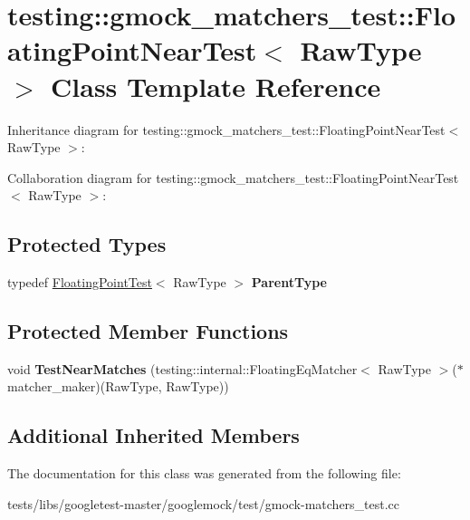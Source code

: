 \hypertarget{classtesting_1_1gmock__matchers__test_1_1FloatingPointNearTest}{}\section{testing\+:\+:gmock\+\_\+matchers\+\_\+test\+:\+:Floating\+Point\+Near\+Test$<$ Raw\+Type $>$ Class Template Reference}
\label{classtesting_1_1gmock__matchers__test_1_1FloatingPointNearTest}


Inheritance diagram for testing\+:\+:gmock\+\_\+matchers\+\_\+test\+:\+:Floating\+Point\+Near\+Test$<$ Raw\+Type $>$\+:


Collaboration diagram for testing\+:\+:gmock\+\_\+matchers\+\_\+test\+:\+:Floating\+Point\+Near\+Test$<$ Raw\+Type $>$\+:
\subsection*{Protected Types}
\begin{DoxyCompactItemize}
\item 
\mbox{\label{classtesting_1_1gmock__matchers__test_1_1FloatingPointNearTest_ac767d2bf3e518d1e7cf9dfafc76cc53a}} 
typedef \hyperlink{classtesting_1_1gmock__matchers__test_1_1FloatingPointTest}{Floating\+Point\+Test}$<$ Raw\+Type $>$ {\bfseries Parent\+Type}
\end{DoxyCompactItemize}
\subsection*{Protected Member Functions}
\begin{DoxyCompactItemize}
\item 
\mbox{\label{classtesting_1_1gmock__matchers__test_1_1FloatingPointNearTest_a712b564197ab76f58d345c5e3e73955d}} 
void {\bfseries Test\+Near\+Matches} (testing\+::internal\+::\+Floating\+Eq\+Matcher$<$ Raw\+Type $>$($\ast$matcher\+\_\+maker)(Raw\+Type, Raw\+Type))
\end{DoxyCompactItemize}
\subsection*{Additional Inherited Members}


The documentation for this class was generated from the following file\+:\begin{DoxyCompactItemize}
\item 
tests/libs/googletest-\/master/googlemock/test/gmock-\/matchers\+\_\+test.\+cc\end{DoxyCompactItemize}
